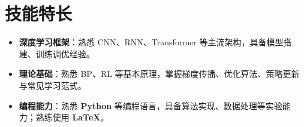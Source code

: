 \documentclass[12pt]{article}
\newlength{\iconwidth}
\begin{document}
\section[技能特长]{\makebox[\iconwidth][c]{\color{primary_color}{\faWrench}}\quad 技能特长}
\begin{itemize}
    \item \textbf{深度学习框架}：熟悉 CNN、RNN、Transformer 等主流架构，具备模型搭建、训练调优经验。
    \item \textbf{理论基础}：熟悉 BP、RL 等基本原理，掌握梯度传播、优化算法、策略更新与常见学习范式。
    \item \textbf{编程能力}：熟悉 \textbf{Python} 等编程语言，具备算法实现、数据处理等实验能力；熟练使用 \textbf{LaTeX}。
\end{itemize}
\end{document}
